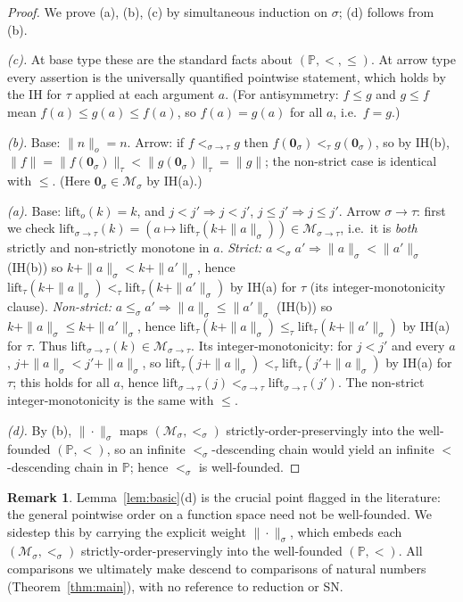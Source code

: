 \documentclass{amsart}
\theoremstyle{definition}
\newtheorem{remark}{Remark}
\begin{document}
\begin{proof}
We prove (a), (b), (c) by simultaneous induction on $\sigma$; (d) follows from (b).

\emph{(c).} At base type these are the standard facts about $(\mathbb P,<,\le)$. At arrow
type every assertion is the universally quantified pointwise statement, which holds by the
IH for $\tau$ applied at each argument $a$. (For antisymmetry: $f\le g$ and $g\le f$ mean
$f(a)\le g(a)\le f(a)$, so $f(a)=g(a)$ for all $a$, i.e.\ $f=g$.)

\emph{(b).} Base: $\|n\|_o=n$. Arrow: if $f<_{\sigma\to\tau}g$ then
$f(\mathbf 0_\sigma)<_\tau g(\mathbf 0_\sigma)$, so by IH(b),
$\|f\|=\|f(\mathbf 0_\sigma)\|_\tau<\|g(\mathbf 0_\sigma)\|_\tau=\|g\|$; the non-strict case
is identical with $\le$. (Here $\mathbf 0_\sigma\in\mathcal M_\sigma$ by IH(a).)

\emph{(a).} Base: $\mathrm{lift}_o(k)=k$, and $j<j'\Rightarrow j<j'$, $j\le j'\Rightarrow
j\le j'$. Arrow $\sigma\to\tau$: first we check
$\mathrm{lift}_{\sigma\to\tau}(k)=(a\mapsto\mathrm{lift}_\tau(k+\|a\|_\sigma))\in
\mathcal M_{\sigma\to\tau}$, i.e.\ it is \emph{both} strictly and non-strictly monotone in
$a$.
\emph{Strict:} $a<_\sigma a'\Rightarrow\|a\|_\sigma<\|a'\|_\sigma$ (IH(b)) so
$k+\|a\|_\sigma<k+\|a'\|_\sigma$, hence $\mathrm{lift}_\tau(k+\|a\|_\sigma)<_\tau
\mathrm{lift}_\tau(k+\|a'\|_\sigma)$ by IH(a) for $\tau$ (its integer-monotonicity clause).
\emph{Non-strict:} $a\le_\sigma a'\Rightarrow\|a\|_\sigma\le\|a'\|_\sigma$ (IH(b)) so
$k+\|a\|_\sigma\le k+\|a'\|_\sigma$, hence $\mathrm{lift}_\tau(k+\|a\|_\sigma)\le_\tau
\mathrm{lift}_\tau(k+\|a'\|_\sigma)$ by IH(a) for $\tau$. Thus
$\mathrm{lift}_{\sigma\to\tau}(k)\in\mathcal M_{\sigma\to\tau}$.
Its integer-monotonicity: for $j<j'$ and every $a$, $j+\|a\|_\sigma<j'+\|a\|_\sigma$, so
$\mathrm{lift}_\tau(j+\|a\|_\sigma)<_\tau\mathrm{lift}_\tau(j'+\|a\|_\sigma)$ by IH(a) for
$\tau$; this holds for all $a$, hence $\mathrm{lift}_{\sigma\to\tau}(j)<_{\sigma\to\tau}
\mathrm{lift}_{\sigma\to\tau}(j')$. The non-strict integer-monotonicity is the same with
$\le$.

\emph{(d).} By (b), $\|\cdot\|_\sigma$ maps $(\mathcal M_\sigma,<_\sigma)$
strictly-order-preservingly into the well-founded $(\mathbb P,<)$, so an infinite
$<_\sigma$-descending chain would yield an infinite $<$-descending chain in $\mathbb P$;
hence $<_\sigma$ is well-founded.
\end{proof}

\begin{remark}
Lemma~\ref{lem:basic}(d) is the crucial point flagged in the literature: the general
pointwise order on a function space need not be well-founded. We sidestep this by carrying
the explicit weight $\|\cdot\|_\sigma$, which embeds each $(\mathcal M_\sigma,<_\sigma)$
strictly-order-preservingly into the well-founded $(\mathbb P,<)$. All comparisons we
ultimately make descend to comparisons of natural numbers (Theorem~\ref{thm:main}), with no
reference to reduction or SN.
\end{remark}
\end{document}
